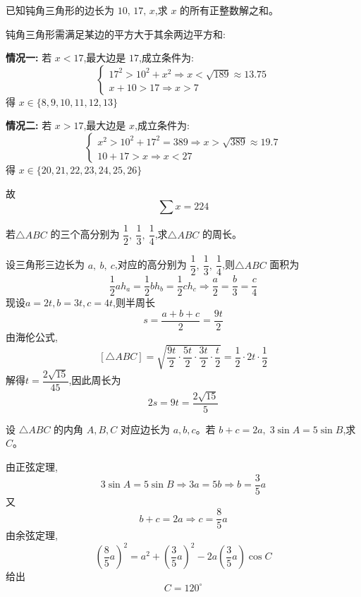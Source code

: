 \nopagecolor
\begin{questions}
    \question 已知钝角三角形的边长为 \(10,\,17,\,x\),求 \(x\) 的所有正整数解之和。  
    \begin{solution}
        钝角三角形需满足某边的平方大于其余两边平方和:
        
        \textbf{情况一:} 若 $x < 17$,最大边是 $17$,成立条件为:
        \[
        \begin{cases}
        17^2 > 10^2 + x^2 \Rightarrow x <\sqrt{189}\approx 13.75\\
        x + 10 > 17 \Rightarrow x > 7
        \end{cases}
        \]
        得 $x \in \{8,9,10,11,12,13\}$
        
        \textbf{情况二:} 若 $x > 17$,最大边是 $x$,成立条件为:
        \[
        \begin{cases}
        x^2 > 10^2 + 17^2 = 389 \Rightarrow x > \sqrt{389} \approx 19.7\\
        10 + 17 > x \Rightarrow x < 27
        \end{cases}
        \]
        得 $x \in \{20,21,22,23,24,25,26\}$
        
        故 $$\sum x=224$$
    \end{solution}
    
    \question 若$\triangle ABC$ 的三个高分别为 $\dfrac{1}{2},\ \dfrac{1}{3},\ \dfrac{1}{4}$,求$\triangle ABC$ 的周长。
    \begin{solution}
        设三角形三边长为 $a,\ b,\ c$,对应的高分别为 $\dfrac{1}{2},\ \dfrac{1}{3},\ \dfrac{1}{4}$,则$\triangle ABC$
        面积为\[
        \frac{1}{2}ah_a = \frac{1}{2}bh_b = \frac{1}{2}ch_c 
        \Rightarrow \frac{a}{2} = \frac{b}{3} = \frac{c}{4}
        \]
        现设$a = 2t, b = 3t, c = 4t$,则半周长
        \[
        s = \frac{a + b + c}{2} = \frac{9t}{2}
        \]
        由海伦公式,
        \[
        [\triangle ABC] 
        = \sqrt{\frac{9t}{2} \cdot \frac{5t}{2} \cdot \frac{3t}{2} \cdot \frac{t}{2}}
        =\frac{1}{2} \cdot 2t \cdot \frac{1}{2}
        \]
        解得$t=\dfrac{2\sqrt{15}}{45}$,因此周长为
        \[
        2s = 9t = \frac{2\sqrt{15}}{5}
        \]
    \end{solution}

    \question 设 \(\triangle ABC\) 的内角 \(A,B,C\) 对应边长为 \(a,b,c\)。若 \(b+c=2a,\; 3\sin A = 5\sin B\),求 \( C\)。  
    \begin{solution}
        由正弦定理,
        \[
        3\sin A = 5\sin B \Rightarrow 3a = 5b \Rightarrow b=\frac{3}{5}a
        \]
        又\[
        b+c=2a \Rightarrow c=\frac{8}{5}a
        \]
        由余弦定理,
        \[
        \left(\frac{8}{5}a\right)^2=a^2+\left(\frac{3}{5}a\right)^2-2a\left(\frac{3}{5}a\right)\cos C
        \]
        给出 
        \[
        C=120^\circ
        \]
    \end{solution}
    

\end{questions}
